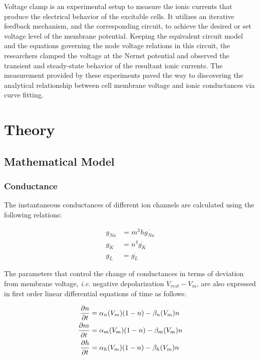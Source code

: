 \documentclass{IEEEtran}
\begin{document}
Voltage clamp is an experimental setup to measure the ionic currents that produce the electrical behavior of the excitable cells. It utilizes an iterative feedback mechanism, and the corresponding circuit, to achieve the desired or set voltage level of the membrane potential. Keeping the equivalent circuit model  and the equations governing the node voltage relations in this circuit, the researchers clamped the voltage at the Nernst potential and observed the transient and steady-state behavior of the resultant ionic currents. The measurement provided by these experiments paved the way to discovering the analytical relationship between cell membrane voltage and ionic conductances via curve fitting. 

\section{Theory}

\subsection{Mathematical Model}
\subsubsection*{Conductance}
The instantaneous conductances of different ion channels are calculated using the following relations:

\begin{align}
    g_{Na} &= m^3h \overline{g_{Na}} \label{eq:g1}\\
    g_{K} &= n^4 \overline{g_K} \label{eq:g2}\\
    g_{L} &= \overline{g_{L}}\label{eq:g3}
\end{align}

The parameters that control the change of conductances in terms of deviation from membrane voltage, \textit{i.e.} negative depolarization $V_{rest} - V_m$, are also expressed in first order linear differential equations of time as follows:

\begin{align}
    \pdv{n}{t} &= \alpha_n(V_m)(1-n) - \beta_n(V_m)n \label{eqn:pdv1}\\
    \pdv{m}{t} &= \alpha_m(V_m)(1-n) - \beta_m(V_m)n \label{eqn:pdv2}\\
    \pdv{h}{t} &= \alpha_h(V_m)(1-n) - \beta_h(V_m)n \label{eqn:pdv3}
\end{align}
\end{document}

